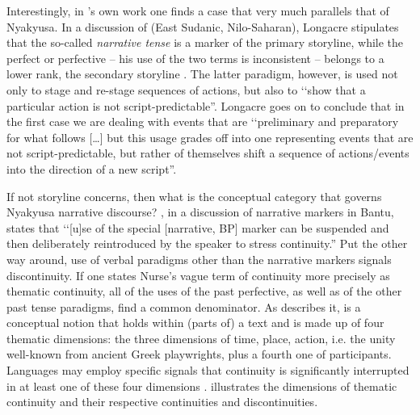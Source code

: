 Interestingly, in \citeauthor{LongacreR1990}'s own work one finds a case that very much parallels that of Nyakyusa. In a discussion of  (East Sudanic, Nilo-Saharan), Longacre stipulates that the so-called \textit{narrative tense} is a marker of the primary storyline, while the perfect or perfective -- his use of the two terms is inconsistent -- belongs to a lower rank, the secondary storyline \citep[91--97]{LongacreR1990}. The latter paradigm, however, is used not only to stage and re-stage sequences of actions, but also to \lq\lq show that a particular action is not script-predictable''. Longacre goes on to conclude that in the first case we are dealing with events that are \lq\lq preliminary and preparatory for what follows [\ldots] but this usage grades off into one representing events that are not script-predictable, but rather of themselves shift a sequence of actions/events into the direction of a new script''.

If not storyline concerns, then what is the conceptual category that governs Nyakyusa narrative discourse? \citet[120]{NurseD2008}, in a discussion of narrative markers in Bantu, states that \lq\lq [u]se of the special [narrative, BP] marker can be suspended and then deliberately reintroduced by the speaker to stress continuity.'' Put the other way around, use of verbal paradigms other than the narrative markers signals discontinuity. If one states Nurse's vague term of continuity more precisely as thematic continuity, all of the uses of the past perfective, as well as of the other past tense paradigms, find a common denominator. As \citet{GivonT1984} describes it,  is a conceptual notion that holds within (parts of) a text and is made up of four thematic dimensions: the three dimensions of time, place, action, i.e. the unity well-known from ancient Greek playwrights, plus a fourth one of participants. Languages may employ specific signals that continuity is significantly interrupted in at least one of these four dimensions \citep{DooleyRALevinsohnSH2000}.  illustrates the dimensions of thematic continuity and their respective continuities and discontinuities.

